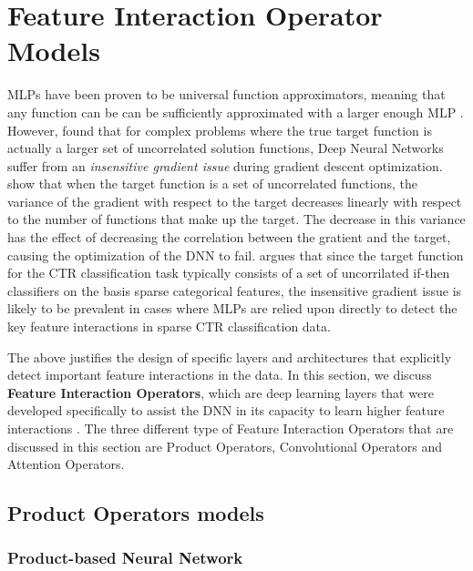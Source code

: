 \documentclass{mldsmsc}
\begin{document}
\section{Feature Interaction Operator Models}
\label{sec:feature-operator-models}

MLPs have been proven to be universal function approximators, meaning that any function can be
can be sufficiently approximated with a larger enough MLP \citep{RefWorks:hornik1989multilayer,RefWorks:cybenko1989approximation,RefWorks:hornik1990universal}.
However, \cite{RefWorks:shalev-shwartz2017failures} found that for complex problems where the true target function
is actually a larger set of uncorrelated solution functions, Deep Neural Networks suffer from
an \emph{insensitive gradient issue} during gradient descent optimization. \cite{RefWorks:shalev-shwartz2017failures}
show that when the target function is a set of uncorrelated functions, the variance of the gradient
with respect to the target decreases linearly with respect to the number of functions that make up the target.
The decrease in this variance has the effect of decreasing the correlation between the gratient
and the target, causing the optimization of the DNN to fail. \cite{RefWorks:qu2018product-based}
argues that since the target function for the CTR classification task typically consists of a
set of uncorrilated if-then classifiers on the basis sparse categorical features, the insensitive
gradient issue is likely to be prevalent in cases where MLPs are relied upon directly
to detect the key feature interactions in sparse CTR classification data.

The above justifies the design of specific layers and architectures that explicitly detect important
feature interactions in the data. In this section, we discuss \textbf{Feature Interaction Operators},
which are deep learning layers that were developed specifically to assist the DNN in its capacity
to learn higher feature interactions \citep{RefWorks:zhang2021deep}. The three different type of Feature Interaction
Operators that are discussed in this section are Product Operators, Convolutional Operators
and Attention Operators.

\subsection{Product Operators models}

\subsubsection{Product-based Neural Network}
\end{document}
